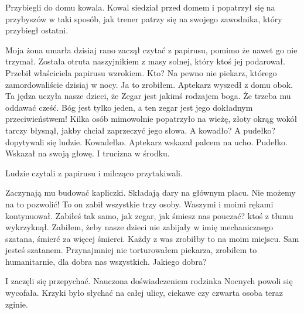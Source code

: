 Przybiegli do domu kowala.
Kowal siedział przed domem i popatrzył się na przybyszów w taki sposób, jak trener patrzy się na swojego zawodnika, który przybiegł ostatni.
\begin{dialogue}
	\ds{} Moja żona umarła dzisiaj rano \dm{} zaczął czytać z papirusu, pomimo że nawet go nie trzymał. \dm{} Została otruta naszyjnikiem z masy solnej, który ktoś jej podarował. \dm{}
		Przebił właściciela papirusu wzrokiem. \dm{} Kto? Na pewno nie piekarz, którego zamordowaliście dzisiaj w nocy.
	\ds{} Ja to zrobiłem. \dm{} Aptekarz wyszedł z domu obok. \dm{} Ta jędza uczyła nasze dzieci, że Zegar jest jakimś rodzajem boga. Że trzeba mu oddawać cześć.
		Bóg jest tylko jeden, a ten zegar jest jego dokładnym przeciwieństwem! \dm{} Kilka osób mimowolnie popatrzyło na wieżę, złoty okrąg wokół tarczy błysnął, jakby chciał zaprzeczyć jego słowa.
	\ds{} A kowadło? A pudełko? \dm{} dopytywali się ludzie.
	\ds{} Kowadełko. \dm{} Aptekarz wskazał palcem na ucho. \dm{} Pudełko. \dm{} Wskazał na swoją głowę. \dm{} I trucizna w środku.
\end{dialogue}
Ludzie czytali z papirusu i milcząco przytakiwali.
\begin{dialogue}
	\ds{} Zaczynają mu budować kapliczki. Składają dary na głównym placu. Nie możemy na to pozwolić! To on zabił wszystkie trzy osoby. Waszymi i moimi rękami \dm{} kontynuował.
	\ds{} Zabiłeś tak samo, jak zegar, jak śmiesz nas pouczać? \dm{} ktoś z tłumu wykrzyknął.
	\ds{} Zabiłem, żeby nasze dzieci nie zabijały w imię mechanicznego szatana, śmierć za więcej śmierci. Każdy z was zrobiłby to na moim miejscu.
	\ds{} Sam jesteś szatanem. 
	\ds{} Przynajmniej nie torturowałem piekarza, zrobiłem to humanitarnie, dla dobra nas wszystkich.
	\ds{} Jakiego dobra?
\end{dialogue}
I zaczęli się przepychać.
Nauczona doświadczeniem rodzinka Nocnych powoli się wycofała.
Krzyki było słychać na całej ulicy, ciekawe czy czwarta osoba teraz zginie.

